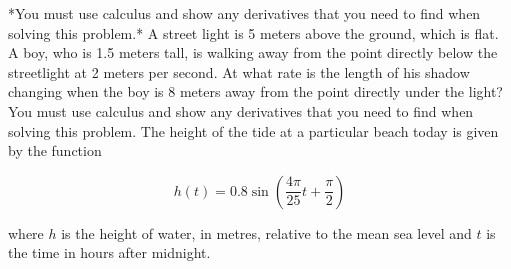 \documentclass[12pt,addpoints]{exam}
\begin{document}
\begin{questions}
*You must use calculus and show any derivatives that you need to find when solving this problem.*
\fillwithlines{5cm}
\question[5] A street light is 5 meters above the ground, which is flat. A boy, who is 1.5 meters tall, is walking away from the point directly below the streetlight at 2 meters per second. At what rate is the length of his shadow changing when the boy is 8 meters away from the point directly under the light? You must use calculus and show any derivatives that you need to find when solving this problem.
\fillwithlines{5cm}
\question[5] The height of the tide at a particular beach today is given by the function

\[ h(t) = 0.8 \sin \left( \frac{4\pi}{25} t + \frac{\pi}{2} \right) \]

where \( h \) is the height of water, in metres, relative to the mean sea level and \( t \) is the time in hours after midnight.


\end{questions}
\end{document}

